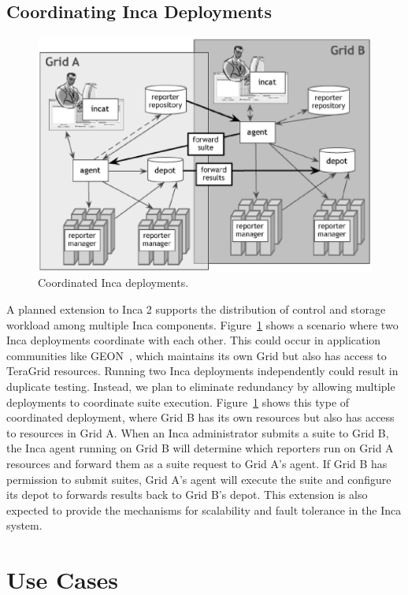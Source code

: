 \documentclass{sig-alternate}
\begin{document}
\vfill\eject 

\subsection{Coordinating Inca Deployments}

\begin{figure}[tbp]
  \centering
  \includegraphics[width=.6\textwidth]{vo.eps}
  \caption{\label{tg_coord_fig} Coordinated Inca deployments.}
\end{figure}

A planned extension to Inca 2 supports the distribution of control and storage
workload among multiple Inca components.  Figure~\ref{tg_coord_fig} shows a
scenario where two Inca deployments coordinate with each other.  This could
occur in application communities like GEON~\cite{geon}, which maintains its
own Grid but also has access to TeraGrid resources.   Running two Inca
deployments independently could result in duplicate testing.  Instead, we plan
to eliminate redundancy by allowing multiple deployments to coordinate suite
execution.
Figure~\ref{tg_coord_fig} shows this type of coordinated deployment, where Grid B 
has its own resources but also has access to resources in Grid A.
When an Inca administrator submits a suite to Grid B, the Inca agent running
on Grid B will determine which reporters run on Grid A resources and forward
them as a suite request to Grid A's agent.  If Grid B has permission to submit
suites, Grid A's agent will execute the suite and configure its depot to
forwards results back to Grid B's depot.  This extension is also expected
to provide the mechanisms for scalability and fault tolerance in the Inca
system.


\section{Use Cases}
\label{usecases}
\end{document}

